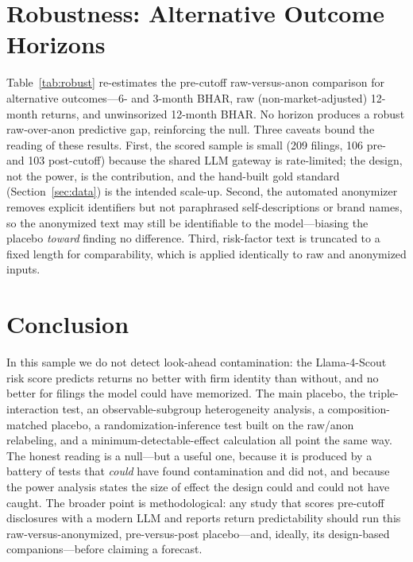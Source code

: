 \documentclass[12pt]{article}
\begin{document}
\section{Robustness: Alternative Outcome Horizons}\label{sec:rob}
Table~\ref{tab:robust} re-estimates the pre-cutoff raw-versus-anon comparison for alternative
outcomes---6- and 3-month BHAR, raw (non-market-adjusted) 12-month returns, and unwinsorized
12-month BHAR. No horizon produces a robust raw-over-anon predictive gap, reinforcing the
null. Three caveats bound the reading of these results. First, the scored sample is small
(209 filings, 106 pre- and 103 post-cutoff) because the shared LLM gateway is rate-limited;
the design, not the power, is the contribution, and the hand-built gold standard
(Section~\ref{sec:data}) is the intended scale-up. Second, the automated anonymizer removes
explicit identifiers but not paraphrased self-descriptions or brand names, so the anonymized
text may still be identifiable to the model---biasing the placebo \emph{toward} finding no
difference. Third, risk-factor text is truncated to a fixed length for comparability, which is
applied identically to raw and anonymized inputs.

\section{Conclusion}\label{sec:concl}
In this sample we do not detect look-ahead contamination: the Llama-4-Scout risk score
predicts returns no better with firm identity than without, and no better for filings the
model could have memorized. The main placebo, the triple-interaction test, an
observable-subgroup heterogeneity analysis, a composition-matched placebo, a
randomization-inference test built on the raw/anon relabeling, and a minimum-detectable-effect
calculation all point the same way. The honest reading is a null---but a useful one, because
it is produced by a battery of tests that \emph{could} have found contamination and did not,
and because the power analysis states the size of effect the design could and could not have
caught. The broader point is methodological: any study that scores pre-cutoff disclosures with
a modern LLM and reports return predictability should run this raw-versus-anonymized,
pre-versus-post placebo---and, ideally, its design-based companions---before claiming a
forecast.
\end{document}
